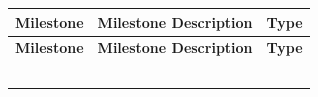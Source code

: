 \documentclass[10pt,letterpaper]{article}
\renewcommand\arraystretch{1.25}
\begin{document}
\begin{center}
\begingroup
\setlength\tabcolsep{2.0pt}
\footnotesize
\renewcommand\arraystretch{1.55}
\begin{longtable}{|>{\raggedright\arraybackslash}p{2.120in}|>{\raggedright\arraybackslash}p{2.120in}|>{\raggedright\arraybackslash}p{2.120in}|}
\hline
\rowcolor{light}
\textbf{Milestone} & \textbf{Milestone Description} & \textbf{Type} \\ \hline
\endfirsthead
\hline\rowcolor{light} \textbf{Milestone} & \textbf{Milestone Description} & \textbf{Type} \\ \hline
\endhead
\rule{0pt}{11pt}\hspace{0pt} & \rule{0pt}{11pt}\hspace{0pt} & \rule{0pt}{11pt}\hspace{0pt} \\ \hline
\rule{0pt}{11pt}\hspace{0pt} & \rule{0pt}{11pt}\hspace{0pt} & \rule{0pt}{11pt}\hspace{0pt} \\ \hline
\rule{0pt}{11pt}\hspace{0pt} & \rule{0pt}{11pt}\hspace{0pt} & \rule{0pt}{11pt}\hspace{0pt} \\ \hline
\rule{0pt}{11pt}\hspace{0pt} & \rule{0pt}{11pt}\hspace{0pt} & \rule{0pt}{11pt}\hspace{0pt} \\ \hline
\rule{0pt}{11pt}\hspace{0pt} & \rule{0pt}{11pt}\hspace{0pt} & \rule{0pt}{11pt}\hspace{0pt} \\ \hline
\end{longtable}
\endgroup
\end{center}
\end{document}
